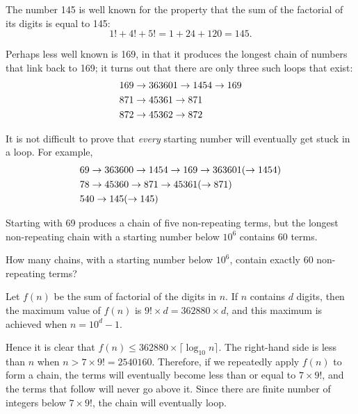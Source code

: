 




The number 145 is well known for the property that the sum of the factorial of its digits is equal to 145:
\[
1! + 4! + 5! = 1 + 24 + 120 = 145 .
\]

Perhaps less well known is 169, in that it produces the longest chain of numbers that link back to 169; it turns out that there are only three such loops that exist:
\begin{align}
  &169 \rightarrow 363601 \rightarrow 1454 \rightarrow 169 \notag \\
  &871 \rightarrow 45361 \rightarrow 871 \notag \\
  &872 \rightarrow 45362 \rightarrow 872 \notag 
\end{align}

It is not difficult to prove that \emph{every} starting number will eventually get stuck in a loop. For example,
\begin{align}
&69 \rightarrow 363600 \rightarrow 1454 \rightarrow 169 \rightarrow 363601 (\rightarrow 1454) \notag \\
&78 \rightarrow 45360 \rightarrow 871 \rightarrow 45361 (\rightarrow 871)\notag \\
&540 \rightarrow 145 (\rightarrow 145)\notag
\end{align}

Starting with 69 produces a chain of five non-repeating terms, but the longest non-repeating chain with a starting number below $10^6$ contains 60 terms.

How many chains, with a starting number below $10^6$, contain exactly 60 non-repeating terms?
 
\solution

Let $f(n)$ be the sum of factorial of the digits in $n$. If $n$ contains $d$ digits, then the maximum value of $f(n)$ is $9! \times d = 362880 \times d$, and this maximum is achieved when $n = 10^d - 1$.

Hence it is clear that $f(n) \le 362880 \times \lceil \log_{10} n \rceil $. The right-hand side is less than $n$ when $n > 7 \times 9! = 2540160$. Therefore, if we repeatedly apply $f(n)$ to form a chain, the terms will eventually become less than or equal to $7 \times 9!$, and the terms that follow will never go above it. Since there are finite number of integers below $7 \times 9!$, the chain will eventually loop.

